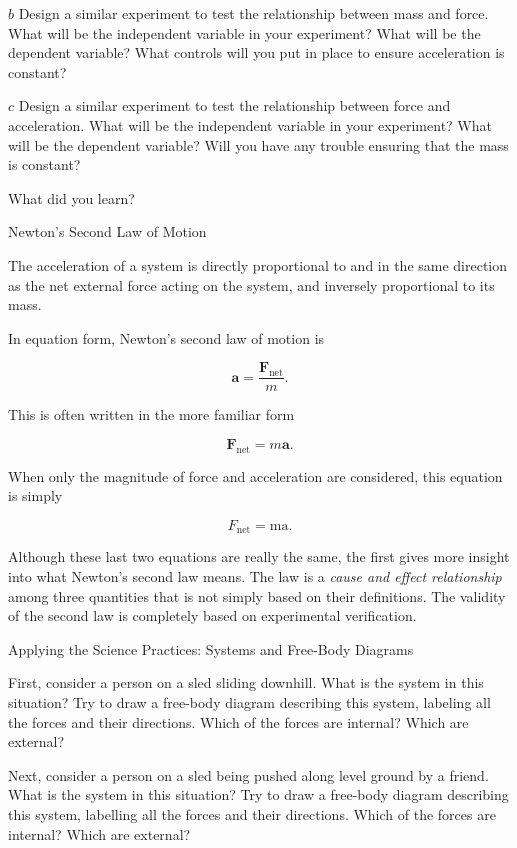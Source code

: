 \documentclass[
]{book}
\begin{document}
\(b\) Design a similar experiment to test the relationship between mass
and force. What will be the independent variable in your experiment?
What will be the dependent variable? What controls will you put in place
to ensure acceleration is constant?

\(c\) Design a similar experiment to test the relationship between force
and acceleration. What will be the independent variable in your
experiment? What will be the dependent variable? Will you have any
trouble ensuring that the mass is constant?

What did you learn?

\hypertarget{fs-id1463122}{}
Newton's Second Law of Motion

The acceleration of a system is directly proportional to and in the same
direction as the net external force acting on the system, and inversely
proportional to its mass.

In equation form, Newton's second law of motion is

\leavevmode{}%
\[{\textbf{a} = \frac{\textbf{F}_{\text{net}}}{m}}.\]

This is often written in the more familiar form

\leavevmode{}%
\[{\textbf{F}_{\text{net}} = m\textbf{a}}.\]

When only the magnitude of force and acceleration are considered, this
equation is simply

\leavevmode{}%
\[{F_{\text{net}} = \text{ma}}.{}\]

Although these last two equations are really the same, the first gives
more insight into what Newton's second law means. The law is a \emph{cause
and effect relationship} among three quantities that is not simply based
on their definitions. The validity of the second law is completely based
on experimental verification.

\hypertarget{fs-id1485153}{}
Applying the Science Practices: Systems and Free-Body Diagrams

First, consider a person on a sled sliding downhill. What is the system
in this situation? Try to draw a free-body diagram describing this
system, labeling all the forces and their directions. Which of the
forces are internal? Which are external?

Next, consider a person on a sled being pushed along level ground by a
friend. What is the system in this situation? Try to draw a free-body
diagram describing this system, labelling all the forces and their
directions. Which of the forces are internal? Which are external?
\end{document}

